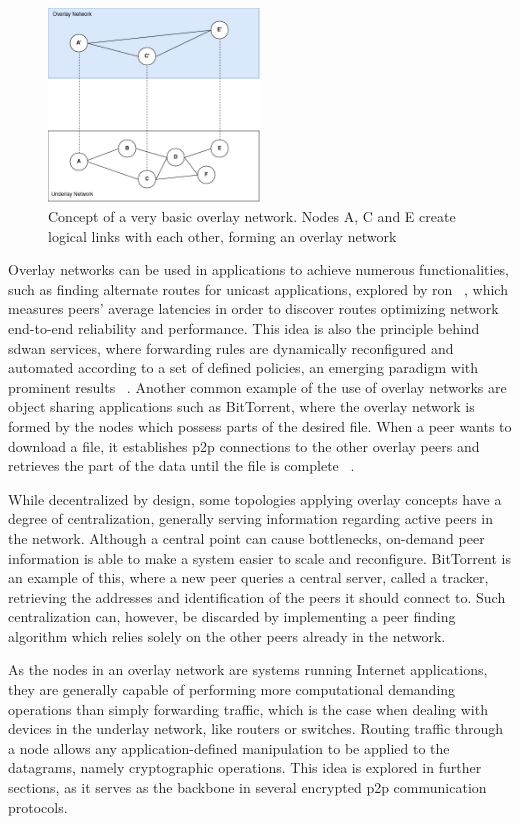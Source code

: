 \documentclass[11pt,twoside,a4paper]{report}
\begin{document}
\begin{figure}[h]
\centering
\includegraphics[width=0.5\textwidth]{overlays.png}
\caption{Concept of a very basic overlay network. Nodes A, C and E create logical links with each other, forming an overlay network}
\label{fig:overlay}
\end{figure}

Overlay networks can be used in applications to achieve numerous functionalities, such as finding alternate routes for unicast applications, explored by \ac{ron} ~\cite{ron}, which measures peers' average latencies in order to discover routes optimizing network end-to-end reliability and performance. This idea is also the principle behind \ac{sdwan} services, where forwarding rules are dynamically reconfigured and automated according to a set of defined policies, an emerging paradigm with prominent results ~\cite{9203058, 9492375}. Another common example of the use of overlay networks are object sharing applications such as BitTorrent, where the overlay network is formed by the nodes which possess parts of the desired file. When a peer wants to download a file, it establishes \ac{p2p} connections to the other overlay peers and retrieves the part of the data until the file is complete ~\cite{5482574}.

While decentralized by design, some topologies applying overlay concepts have a degree of centralization, generally serving information regarding active peers in the network. Although a central point can cause bottlenecks, on-demand peer information is able to make a system easier to scale and reconfigure. BitTorrent is an example of this, where a new peer queries a central server, called a tracker, retrieving the addresses and identification of the peers it should connect to. Such centralization can, however, be discarded by implementing a peer finding algorithm which relies solely on the other peers already in the network.

As the nodes in an overlay network are systems running Internet applications, they are generally capable of performing more computational demanding operations than simply forwarding traffic, which is the case when dealing with devices in the underlay network, like routers or switches. Routing traffic through a node allows any application-defined manipulation to be applied to the datagrams, namely cryptographic operations. This idea is explored in further sections, as it serves as the backbone in several encrypted \ac{p2p} communication protocols.
\end{document}
